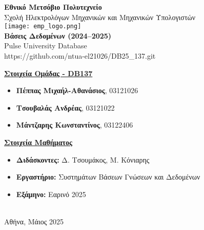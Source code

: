 \documentclass[13pt]{extarticle}
\begin{document}
\begin{titlepage}
    \centering

    {\huge \textbf{Εθνικό Μετσόβιο Πολυτεχνείο}}\\[0.3cm]
    {\Large Σχολή Ηλεκτρολόγων Μηχανικών και Μηχανικών Υπολογιστών}\\[2.8cm]

    \texttt{[image: emp\_logo.png]} \\[2.8cm]

    {\huge \textbf{Βάσεις Δεδομένων (2024–2025)}}\\[0.3cm]
    {\LARGE Pulse University Database}\\[0.8cm]
    {\Large https://github.com/ntua-el21026/DB25\_137.git}\\[2.8cm]

    \noindent
    \begin{minipage}[t]{0.48\textwidth}
        \raggedright
        {\large \underline{\textbf{Στοιχεία Ομάδας - DB137}}}\\[0.4cm]
        \begin{itemize}[left=0pt,label=--]
            \item \textbf{Πέππας Μιχαήλ-Αθανάσιος}, 03121026
            \item \textbf{Τσουβαλάς Ανδρέας}, 03121022
            \item \textbf{Μάντζαρης Κωνσταντίνος}, 03122406
        \end{itemize}
    \end{minipage}
    \hfill
    \begin{minipage}[t]{0.48\textwidth}
        \raggedright
        {\large \underline{\textbf{Στοιχεία Μαθήματος}}}\\[0.4cm]
        \begin{itemize}[left=0pt,label=--]
            \item \textbf{Διδάσκοντες:} Δ. Τσουμάκος, Μ. Κόνιαρης
            \item \textbf{Εργαστήριο:} Συστημάτων Βάσεων Γνώσεων και Δεδομένων
            \item \textbf{Εξάμηνο:} Εαρινό 2025
        \end{itemize}
    \end{minipage}\\[2.5cm]

    {\large Αθήνα, Μάιος 2025}
\end{titlepage}
\end{document}
